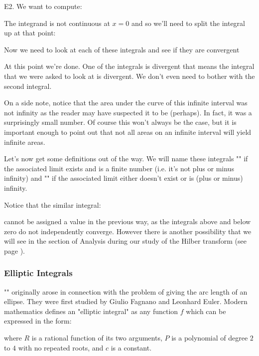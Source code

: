 	\begin{tcolorbox}[colframe=black,colback=white,sharp corners]
	
	E2. We want to compute:
	
	The integrand is not continuous at $x=0$ and so we’ll need to split the integral up at that point:
	
	Now we need to look at each of these integrals and see if they are convergent
	
	At this point we're done.  One of the integrals is divergent that means the integral that we were asked to look at is divergent.  We don't even need to bother with the second integral.
	\end{tcolorbox}
	On a side note, notice that the area under the curve of this infinite interval was not infinity as the reader may have suspected it to be (perhaps).  In fact, it was a surprisingly small number.  Of course this won't always be the case, but it is important enough to point out that not all areas on an infinite interval will yield infinite areas.
 
	Let's now get some definitions out of the way.  We will name these integrals "" if the associated limit exists and is a finite number (i.e. it's not plus or minus infinity) and "" if the associated limit either doesn't exist or is (plus or minus) infinity.
	
	Notice that the similar integral:
	
	cannot be assigned a value in the previous way, as the integrals above and below zero do not independently converge. However there is another possibility that we will see in the section of Analysis during our study of the Hilber transform (see page \pageref{hilbert transform}).
	
	\pagebreak
	\subsubsection{Elliptic Integrals}\label{elliptic integrals}
	"" originally arose in connection with the problem of giving the arc length of an ellipse. They were first studied by Giulio Fagnano and Leonhard Euler. Modern mathematics defines an "elliptic integral" as any function $f$ which can be expressed in the form:
	
	where $R$ is a rational function of its two arguments, $P$ is a polynomial of degree $2$ to $4$ with no repeated roots, and $c$ is a constant.

